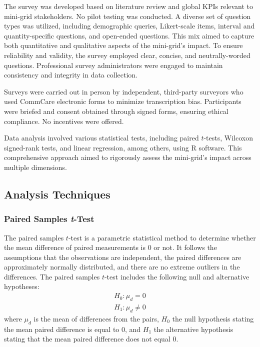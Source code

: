 The survey was developed based on literature review and global KPIs relevant to mini-grid stakeholders. No pilot testing was conducted. A diverse set of question types was utilized, including demographic queries, Likert-scale items, interval and quantity-specific questions, and open-ended questions. This mix aimed to capture both quantitative and qualitative aspects of the mini-grid's impact. To ensure reliability and validity, the survey employed clear, concise, and neutrally-worded questions. Professional survey administrators were engaged to maintain consistency and integrity in data collection.

Surveys were carried out in person by independent, third-party surveyors who used CommCare electronic forms to minimize transcription bias. Participants were briefed and consent obtained through signed forms, ensuring ethical compliance. No incentives were offered.

Data analysis involved various statistical tests, including paired $t$-tests, Wilcoxon signed-rank tests, and linear regression, among others, using R software. This comprehensive approach aimed to rigorously assess the mini-grid's impact across multiple dimensions.

\subsection{Analysis Techniques}
\subsubsection{Paired Samples \textit{t}-Test}
\hfill \break
The paired samples $t$-test is a parametric statistical method to determine whether the mean difference of paired measurements is 0 or not. It follows the assumptions that the observations are independent, the paired differences are approximately normally distributed, and there are no extreme outliers in the differences. The paired samples $t$-test includes the following null and alternative hypotheses:
\begin{equation}
\begin{array}{c}
	H_0 : \mu_d = 0 \\
	H_1 :  \mu_d \neq 0
\end{array}
\end{equation}
where $\mu_d$ is the mean of differences from the pairs, $H_0$ the null hypothesis stating the mean paired difference is equal to 0, and $H_1$ the alternative hypothesis stating that the mean paired difference does not equal 0.


